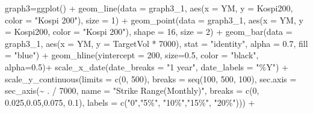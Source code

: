 \documentclass[
  a4paper,
  DIV=11,
  numbers=noendperiod]{scrreprt}
\newenvironment{Shaded}{\begin{snugshade}}{\end{snugshade}}
\newcommand{\AttributeTok}[1]{\textcolor[rgb]{0.40,0.45,0.13}{#1}}
\newcommand{\DecValTok}[1]{\textcolor[rgb]{0.68,0.00,0.00}{#1}}
\newcommand{\FloatTok}[1]{\textcolor[rgb]{0.68,0.00,0.00}{#1}}
\newcommand{\FunctionTok}[1]{\textcolor[rgb]{0.28,0.35,0.67}{#1}}
\newcommand{\NormalTok}[1]{\textcolor[rgb]{0.00,0.23,0.31}{#1}}
\newcommand{\OtherTok}[1]{\textcolor[rgb]{0.00,0.23,0.31}{#1}}
\newcommand{\SpecialCharTok}[1]{\textcolor[rgb]{0.37,0.37,0.37}{#1}}
\newcommand{\StringTok}[1]{\textcolor[rgb]{0.13,0.47,0.30}{#1}}
\begin{document}
\begin{Shaded}
\begin{Highlighting}[]
\NormalTok{graph3}\OtherTok{=}\FunctionTok{ggplot}\NormalTok{() }\SpecialCharTok{+}
  \FunctionTok{geom\_line}\NormalTok{(}\AttributeTok{data =}\NormalTok{ graph3\_1, }\FunctionTok{aes}\NormalTok{(}\AttributeTok{x =}\NormalTok{ YM, }\AttributeTok{y =}\NormalTok{ Kospi200, }\AttributeTok{color =} \StringTok{"Kospi 200"}\NormalTok{), }\AttributeTok{size =} \DecValTok{1}\NormalTok{) }\SpecialCharTok{+}
  \FunctionTok{geom\_point}\NormalTok{(}\AttributeTok{data =}\NormalTok{ graph3\_1, }\FunctionTok{aes}\NormalTok{(}\AttributeTok{x =}\NormalTok{ YM, }\AttributeTok{y =}\NormalTok{ Kospi200, }\AttributeTok{color =} \StringTok{"Kospi 200"}\NormalTok{), }\AttributeTok{shape =} \DecValTok{16}\NormalTok{, }\AttributeTok{size =} \DecValTok{2}\NormalTok{) }\SpecialCharTok{+}
  \FunctionTok{geom\_bar}\NormalTok{(}\AttributeTok{data =}\NormalTok{ graph3\_1, }\FunctionTok{aes}\NormalTok{(}\AttributeTok{x =}\NormalTok{ YM, }\AttributeTok{y =}\NormalTok{ TargetVol }\SpecialCharTok{*} \DecValTok{7000}\NormalTok{),}
           \AttributeTok{stat =} \StringTok{"identity"}\NormalTok{, }\AttributeTok{alpha =} \FloatTok{0.7}\NormalTok{, }\AttributeTok{fill =} \StringTok{"blue"}\NormalTok{) }\SpecialCharTok{+}
  \FunctionTok{geom\_hline}\NormalTok{(}\AttributeTok{yintercept =} \DecValTok{200}\NormalTok{, }\AttributeTok{size=}\FloatTok{0.5}\NormalTok{, }\AttributeTok{color =} \StringTok{"black"}\NormalTok{, }\AttributeTok{alpha=}\FloatTok{0.5}\NormalTok{)}\SpecialCharTok{+}
  \FunctionTok{scale\_x\_date}\NormalTok{(}\AttributeTok{date\_breaks =} \StringTok{"1 year"}\NormalTok{, }\AttributeTok{date\_labels =} \StringTok{"\%Y"}\NormalTok{) }\SpecialCharTok{+}
  \FunctionTok{scale\_y\_continuous}\NormalTok{(}\AttributeTok{limits =} \FunctionTok{c}\NormalTok{(}\DecValTok{0}\NormalTok{, }\DecValTok{500}\NormalTok{), }\AttributeTok{breaks =} \FunctionTok{seq}\NormalTok{(}\DecValTok{100}\NormalTok{, }\DecValTok{500}\NormalTok{, }\DecValTok{100}\NormalTok{),}
                     \AttributeTok{sec.axis =} \FunctionTok{sec\_axis}\NormalTok{(}\SpecialCharTok{\textasciitilde{}}\NormalTok{ . }\SpecialCharTok{/} \DecValTok{7000}\NormalTok{, }\AttributeTok{name =} \StringTok{"Strike Range(Monthly)"}\NormalTok{, }\AttributeTok{breaks =} \FunctionTok{c}\NormalTok{(}\DecValTok{0}\NormalTok{, }\FloatTok{0.025}\NormalTok{,}\FloatTok{0.05}\NormalTok{,}\FloatTok{0.075}\NormalTok{, }\FloatTok{0.1}\NormalTok{), }\AttributeTok{labels =} \FunctionTok{c}\NormalTok{(}\StringTok{"0"}\NormalTok{,}\StringTok{"5\%"}\NormalTok{, }\StringTok{"10\%"}\NormalTok{,}\StringTok{"15\%"}\NormalTok{, }\StringTok{"20\%"}\NormalTok{))) }\SpecialCharTok{+}

\end{Highlighting}
\end{Shaded}
\end{document}
